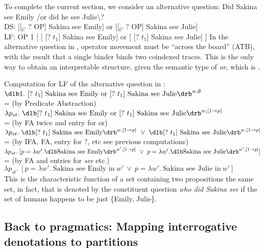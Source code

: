 To complete the current section, we consider an alternative question:
%
%
\ex Did Sakina see Emily /or did he see Julie\textbackslash ?\\
DS: [[$_{C}$ ? OP] Sakina see Emily] or [[$_{C}$ ? OP] Sakina see Julie]\\
LF: OP 1 [ [ [? $t_{1}$] Sakina see Emily] or [ [? $t_{1}$] Sakina see Julie] ]
\xe
%
In the alternative question in \Last, operator movement must be ``across the
board'' (ATB), with the result that a single binder binds two coindexed traces.
This is the only way to obtain an interpretable structure, given the semantic
type of \emph{or}, which is .

\ex Computation for LF of the alternative question in \Last:\\
$\sv{1.\ [?\ t_{1}]\ \text{Sakina see Emily or}\ [?\ t_{1}]\ \text{Sakina see
    Julie}}^{w,\emptyset}$\\
{\small = (by Predicate Abstraction)}\\
$\lambda p_{st}.\ \sv{[?\ t_{1}]\ \text{Sakina see Emily
    or}\ [?\ t_{1}]\ \text{Sakina see
    Julie}}^{w,[1\rightarrow p]}$\\
{\small = (by FA twice and entry for or)}\\
$\lambda p_{st}.\ \sv{[?\ t_{1}]\ \text{Sakina see Emily}}^{w,[1\rightarrow p]}\
\vee\ \sv{[?\ t_{1}]\ \text{Sakina see Julie}}^{w,[1\rightarrow p]}$\\
{\small = (by IFA, FA, entry for ?, etc \dash see previous computations)}\\
$\lambda p_{st}.\ [ p = \lambda w'.\svt{Sakina see Emily}^{w',[1\rightarrow p]}\
\vee\ p = \lambda w'.\svt{Sakina see Julie}^{w',[1\rightarrow p]}]$\\
{\small = (by FA and entries for \emph{see} etc.)}\\
$\lambda p_{st}.\ [ p = \lambda w'.\ \text{Sakina see Emily
  in}\ w'\ \vee\ p = \lambda w'.\ \text{Sakina
  see Julie in}\ w']$\\
\xe
%
This is the characteristic function of a set containing two propositions \dash
the same set, in fact, that is denoted by the constituent question \emph{who did
  Sakina see} if the set of humans happens to be just \{Emily, Julie\}.

\subsection{Back to pragmatics: Mapping interrogative denotations to partitions}
\label{sec:back-to-pragmatics}

